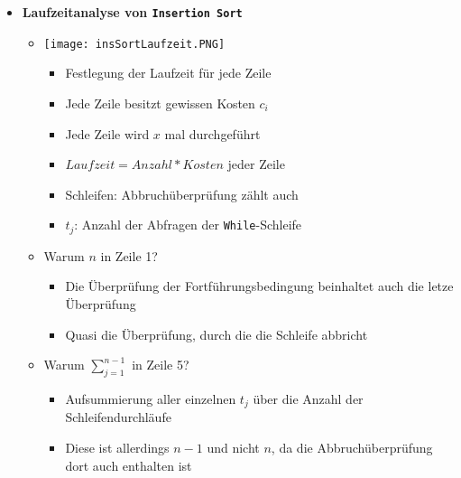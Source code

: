 \begin{itemize}
        \item \textbf{Laufzeitanalyse von \texttt{Insertion Sort}} {\label{insSortLaufzeit}}
            \begin{itemize}
                \item[] 
                    \begin{minipage}{0.45\textwidth}
                    \texttt{[image: insSortLaufzeit.PNG]}
                    \end{minipage}
                    \begin{minipage}[t]{0.45\textwidth}
                    \vspace{-2.5cm}
                    \begin{itemize}
                        \item Festlegung der Laufzeit für jede Zeile
                        \item Jede Zeile besitzt gewissen Kosten \texttt{$c_i$}
                        \item Jede Zeile wird $x$ mal durchgeführt 
                        \item $Laufzeit = Anzahl * Kosten$ jeder Zeile
                        \item Schleifen: Abbruchüberprüfung zählt auch
                        \item \texttt{$t_j$}: Anzahl der Abfragen der \texttt{While}-Schleife
                    \end{itemize}
                    \end{minipage}

                \item Warum $n$ in Zeile 1?
                    \begin{itemize}
                        \item Die Überprüfung der Fortführungsbedingung beinhaltet auch die letze Überprüfung 
                        \item Quasi die Überprüfung, durch die die Schleife abbricht
                    \end{itemize}

                \item Warum $\sum^{n-1}_{j=1}$ in Zeile 5?
                    \begin{itemize}
                        \item Aufsummierung aller einzelnen $t_j$ über die Anzahl der Schleifendurchläufe
                        \item Diese ist allerdings $n-1$ und nicht $n$, da die Abbruchüberprüfung dort auch enthalten ist
                    \end{itemize}
                

\end{itemize}
\end{itemize}
